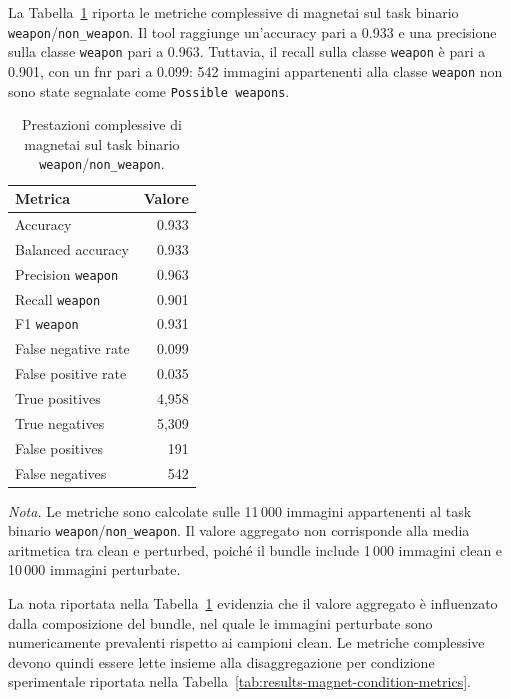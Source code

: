 La Tabella~\ref{tab:results-magnet-global-metrics} riporta le metriche
complessive di \gls{magnetai} sul task binario
\texttt{weapon}/\texttt{non\_weapon}. Il tool raggiunge un'accuracy pari a
0.933 e una precisione sulla classe \texttt{weapon} pari a 0.963. Tuttavia, il
recall sulla classe \texttt{weapon} è pari a 0.901, con un \gls{fnr} pari a
0.099: 542 immagini appartenenti alla classe \texttt{weapon} non sono state
segnalate come \texttt{Possible weapons}.

\begin{table}[H]
\centering
\caption{Prestazioni complessive di \gls{magnetai} sul task binario \texttt{weapon}/\texttt{non\_weapon}.}
\label{tab:results-magnet-global-metrics}
\small
\begin{tabular}{lr}
\toprule
\textbf{Metrica} & \textbf{Valore} \\
\midrule
Accuracy & 0.933 \\
Balanced accuracy & 0.933 \\
Precision \texttt{weapon} & 0.963 \\
Recall \texttt{weapon} & 0.901 \\
F1 \texttt{weapon} & 0.931 \\
False negative rate & 0.099 \\
False positive rate & 0.035 \\
True positives & 4,958 \\
True negatives & 5,309 \\
False positives & 191 \\
False negatives & 542 \\
\bottomrule
\end{tabular}

\vspace{0.4em}
\footnotesize
\textit{Nota.} Le metriche sono calcolate sulle 11\,000 immagini appartenenti al
task binario \texttt{weapon}/\texttt{non\_weapon}. Il valore aggregato non
corrisponde alla media aritmetica tra clean e perturbed, poiché il bundle include
1\,000 immagini clean e 10\,000 immagini perturbate.
\end{table}

La nota riportata nella Tabella~\ref{tab:results-magnet-global-metrics}
evidenzia che il valore aggregato è influenzato dalla composizione del bundle,
nel quale le immagini perturbate sono numericamente prevalenti rispetto ai
campioni clean. Le metriche complessive devono quindi essere lette insieme alla
disaggregazione per condizione sperimentale riportata nella
Tabella~\ref{tab:results-magnet-condition-metrics}.

